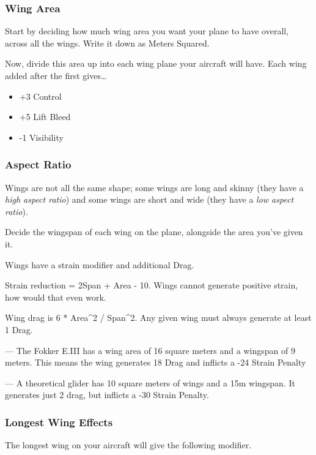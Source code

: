 \documentclass{article}
\begin{document}
\subsubsection{Wing Area}
\label{_Wing_Area}

Start by deciding how much wing area you want your plane to have
overall, across all the wings. Write it down as Meters Squared.

Now, divide this area up into each wing plane your aircraft will have.
Each wing added after the first gives\ldots{}

\begin{itemize}
    \item          +3 Control
    \item          +5 Lift Bleed
    \item          -1 Visibility
\end{itemize}

\subsubsection{Aspect Ratio}
\label{_Aspect Ratio}

Wings are not all the same shape; some wings are long and skinny (they
have a \emph{high aspect ratio}) and some wings are short and wide (they
have a \emph{low aspect ratio}).

Decide the wingspan of each wing on the plane, alongside the area you've
given it.

Wings have a strain modifier and additional Drag.

Strain reduction = 2Span + Area - 10. Wings cannot generate positive
strain, how would that even work.

Wing drag is 6 * Area\^{}2 / Span\^{}2. Any given wing must always
generate at least 1 Drag.

--- The Fokker E.III has a wing area of 16 square
meters and a wingspan of 9 meters. This means the wing generates
18 Drag and inflicts a -24 Strain Penalty

--- A theoretical glider has 10 square meters of wings and a
15m wingspan. It generates just 2 drag,
but inflicts a -30 Strain Penalty.

\subsubsection{Longest Wing Effects}
\label{_Longest Wing Effects}

The longest wing on your aircraft will give the following modifier.
\end{document}
